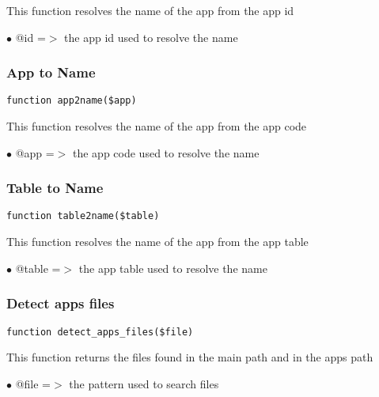\documentclass[a4paper]{article}
\begin{document}
This function resolves the name of the app from the app id

\begin{compactitem}
\item[\color{myblue}$\bullet$] @id =$>$ the app id used to resolve the name
\end{compactitem}

\hypertarget{toc43}{}
\subsubsection{App to Name}

\begin{lstlisting}
function app2name($app)
\end{lstlisting}

This function resolves the name of the app from the app code

\begin{compactitem}
\item[\color{myblue}$\bullet$] @app =$>$ the app code used to resolve the name
\end{compactitem}

\hypertarget{toc44}{}
\subsubsection{Table to Name}

\begin{lstlisting}
function table2name($table)
\end{lstlisting}

This function resolves the name of the app from the app table

\begin{compactitem}
\item[\color{myblue}$\bullet$] @table =$>$ the app table used to resolve the name
\end{compactitem}

\hypertarget{toc45}{}
\subsubsection{Detect apps files}

\begin{lstlisting}
function detect_apps_files($file)
\end{lstlisting}

This function returns the files found in the main path and in the apps path

\begin{compactitem}
\item[\color{myblue}$\bullet$] @file =$>$ the pattern used to search files
\end{compactitem}
\end{document}
